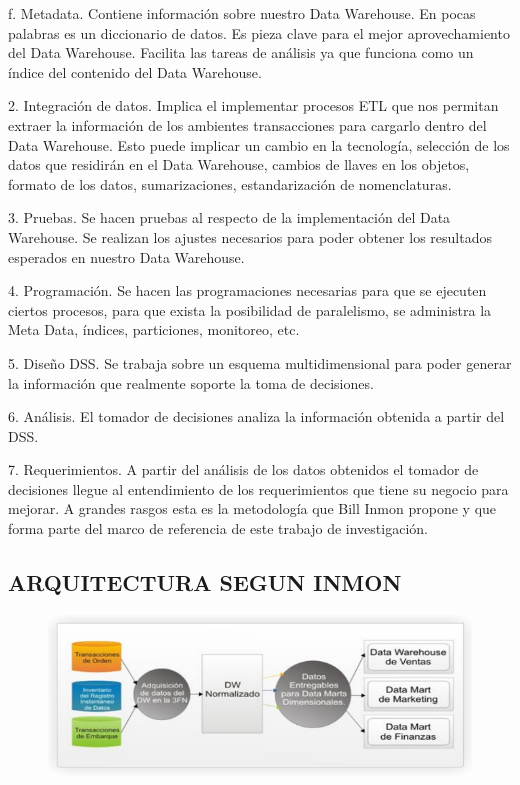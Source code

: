 \documentclass[preprint,12pt]{elsarticle}
\begin{document}
	f. Metadata. Contiene información sobre nuestro Data Warehouse. En pocas palabras es un diccionario de datos. Es pieza clave para el mejor aprovechamiento del Data Warehouse. Facilita las tareas de análisis ya que funciona como un índice del contenido del Data Warehouse.

2. Integración de datos. Implica el implementar procesos ETL que nos permitan extraer la información de los ambientes transacciones para cargarlo dentro del Data Warehouse. Esto puede implicar un cambio en la tecnología, selección de los datos que residirán en el Data Warehouse, cambios de llaves en los objetos, formato de los datos, sumarizaciones, estandarización de nomenclaturas.

3. Pruebas. Se hacen pruebas al respecto de la implementación del Data Warehouse. Se realizan los ajustes necesarios para poder obtener los resultados esperados en nuestro Data Warehouse.

4. Programación. Se hacen las programaciones necesarias para que se ejecuten ciertos procesos, para que exista la posibilidad de paralelismo, se administra la Meta Data, índices, particiones, monitoreo, etc.

5. Diseño DSS. Se trabaja sobre un esquema multidimensional para poder generar la información que realmente soporte la toma de decisiones.

6. Análisis. El tomador de decisiones analiza la información obtenida a partir del DSS.

7. Requerimientos. A partir del análisis de los datos obtenidos el tomador de decisiones llegue al entendimiento de los requerimientos que tiene su negocio para mejorar. A grandes rasgos esta es la metodología que Bill Inmon propone y que forma parte del marco de referencia de este trabajo de investigación.

\subsection{ARQUITECTURA SEGUN INMON}
	
	
			\begin{figure}[htb]
				\begin{center}
					\includegraphics[width=15cm]{./IMAGENES/imgleydi2}
				\end{center}
			\end{figure}
\end{document}
